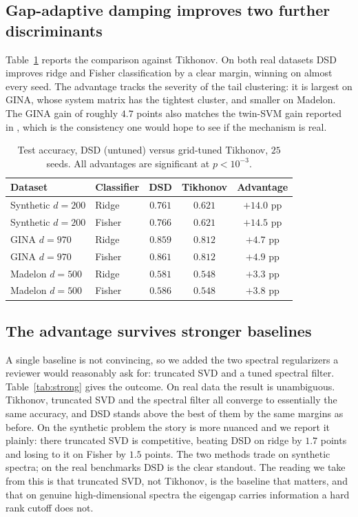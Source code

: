 \documentclass[preprint,12pt]{elsarticle}
\begin{document}
\subsection{Gap-adaptive damping improves two further discriminants}
Table~\ref{tab:breadth} reports the comparison against Tikhonov. On both real datasets DSD improves
ridge and Fisher classification by a clear margin, winning on almost every seed. The advantage tracks
the severity of the tail clustering: it is largest on GINA, whose system matrix has the tightest
cluster, and smaller on Madelon. The GINA gain of roughly $4.7$ points also matches the twin-SVM gain
reported in \cite{vashishtha2026dsd}, which is the consistency one would hope to see if the mechanism
is real.

\begin{table}[t]
\centering
\caption{Test accuracy, DSD (untuned) versus grid-tuned Tikhonov, $25$ seeds. All advantages are
significant at $p<10^{-3}$.}
\label{tab:breadth}
\begin{tabular}{llccc}
\toprule
Dataset & Classifier & DSD & Tikhonov & Advantage \\
\midrule
Synthetic $d{=}200$ & Ridge  & $0.761$ & $0.621$ & $+14.0$ pp \\
Synthetic $d{=}200$ & Fisher & $0.766$ & $0.621$ & $+14.5$ pp \\
GINA $d{=}970$      & Ridge  & $0.859$ & $0.812$ & $+4.7$ pp \\
GINA $d{=}970$      & Fisher & $0.861$ & $0.812$ & $+4.9$ pp \\
Madelon $d{=}500$   & Ridge  & $0.581$ & $0.548$ & $+3.3$ pp \\
Madelon $d{=}500$   & Fisher & $0.586$ & $0.548$ & $+3.8$ pp \\
\bottomrule
\end{tabular}
\end{table}

\subsection{The advantage survives stronger baselines}
A single baseline is not convincing, so we added the two spectral regularizers a reviewer would
reasonably ask for: truncated SVD and a tuned spectral filter. Table~\ref{tab:strong} gives the
outcome. On real data the result is unambiguous. Tikhonov, truncated SVD and the spectral filter all
converge to essentially the same accuracy, and DSD stands above the best of them by the same margins
as before. On the synthetic problem the story is more nuanced and we report it plainly: there
truncated SVD is competitive, beating DSD on ridge by $1.7$ points and losing to it on Fisher by
$1.5$ points. The two methods trade on synthetic spectra; on the real benchmarks DSD is the clear
standout. The reading we take from this is that truncated SVD, not Tikhonov, is the baseline that
matters, and that on genuine high-dimensional spectra the eigengap carries information a hard rank
cutoff does not.
\end{document}
